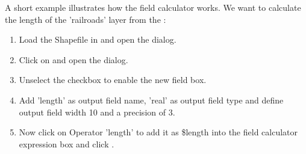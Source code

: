 A short example illustrates how the field calculator works. We want to calculate 
the length of the 'railroads' layer from the :

\begin{enumerate}
\item Load the Shapefile  in \qg and open 
the  dialog. 
\item Click on  and 
open the  dialog.
\item Unselect the  checkbox to enable the 
new field box.
\item Add 'length' as output field name, 'real' as output field type and define 
output field width 10 and a precision of 3.
\item Now click on Operator 'length' to add it as \$length into the 
field calculator expression box and click .
\end{enumerate}
